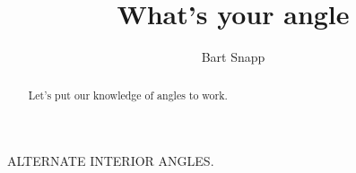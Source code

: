 \documentclass[handout,nooutcomes,noauthor]{ximera}
\title{What's your angle}
\author{Bart Snapp}
\begin{document}
\begin{abstract}
  Let's put our knowledge of angles to work. 
\end{abstract}
\maketitle


\begin{listOutcomes}
\item 
\end{listOutcomes}

\mynewpage



\begin{question}
ALTERNATE INTERIOR ANGLES.

\end{question}

\mynewpage


\begin{question}
\end{question}

\mynewpage


\begin{question}
\end{question}








\end{document}
